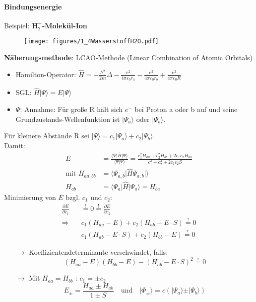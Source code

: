 \paragraph{Bindungsenergie}
Beispiel: \textbf{H$_2^+$-Molekül-Ion}
\begin{figure}[H]
	\centering
	\texttt{[image: figures/1\_4WasserstoffH2O.pdf]}
	\caption{}
	\label{}
\end{figure}
\textbf{Näherungsmethode}: LCAO-Methode (Linear Combination of Atomic Orbitals)
\begin{itemize}
	\item Hamilton-Operator: $\hat H = - \frac{\hbar^2}{2m} \Delta - \frac{e^2}{4 \pi \varepsilon_0 r_a} - \frac{e^2}{4 \pi \varepsilon_0 r_b} +\frac{e^2}{4 \pi \varepsilon_0 R}$
	\item SGL: $\hat H \vert\Psi\rangle = E \vert\Psi\rangle$
	\item $\Psi$: Annahme: Für große R hält sich $e^-$ bei Proton a oder b auf und seine Grundzustands-Wellenfunktion ist $\vert\Psi_a\rangle$ oder $\vert\Psi_b\rangle$.\\
\end{itemize}
Für kleinere Abstände R sei $\vert\Psi\rangle = c_1 \vert\Psi_a\rangle + c_2 \vert\Psi_b\rangle$. \\
Damit:
\begin{align*}
	E &= \frac{\langle\Psi\vert\hat{H}\vert\Psi\rangle}{\langle\Psi\vert\Psi\rangle} = \frac{c_1^2 H_{aa} + c_2^2 H_{bb} + 2 c_1 c_2 H_{ab}}{c_1^2 + c_2^2 + 2 c_1 c_2 S}\\
	\text{mit } H_{aa,bb} &= \langle\Psi_{a,b}\vert\hat{H}\Psi_{a,b}\vert\rangle\\  
	H_{ab} &= \langle\Psi_a\vert\hat{H}\vert\Psi_a\rangle = H_{ba}
\end{align*}
Minimierung von $E$ bzgl. $c_1$ und $c_2$:
\begin{align*}
	\frac{\partial E}{\partial c_1} &\stackrel{!}{=} 0 \stackrel{!}{=} \frac{\partial E}{\partial c_2}\\
	\Rightarrow \quad &c_1(H_{aa}-E)+c_2(H_{ab}-E\cdot S) \stackrel{!}{=} 0\\
	&c_1(H_{ab}-E\cdot S)+c_2(H_{bb}-E) \stackrel{!}{=} 0
\end{align*}
\begin{itemize}
	\item[$\rightarrow$] Koeffizientendeterminante verschwindet, falls:
	$$ (H_{aa}-E)(H_{bb}-E) - (H_{ab}-E \cdot S)^2 \stackrel{!}{=} 0 $$
	\item[$\rightarrow$] Mit $H_{aa} = H_{bb}$ : $c_1 = \pm c_2 $
	$$E_{\pm} = \frac{H_{aa} \pm H_{ab}}{1 \pm S} \quad \text{und} \quad \vert\Phi_{\pm}\rangle = c (\vert\Psi_a\rangle \pm \vert\Psi_b\rangle) $$
\end{itemize}
